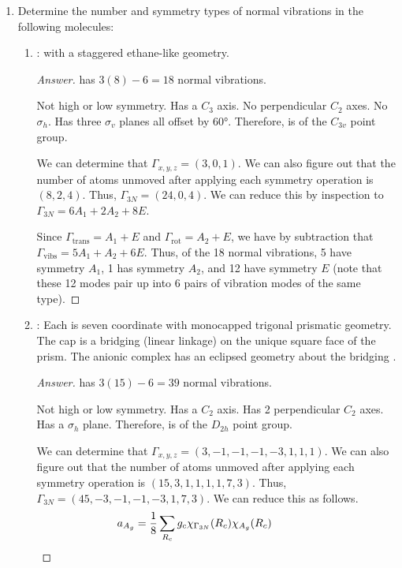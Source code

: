 \documentclass[../psets.tex]{subfiles}
\begin{document}
\begin{enumerate}[label={\Roman*)}]
\begin{proof}[Answer]
    \end{proof}
    \newpage
    \item Determine the number and symmetry types of normal vibrations in the following molecules:
    \begin{enumerate}[label={\alph*)}]
        \item {}: with a staggered ethane-like geometry.
        \begin{proof}[Answer]
             has $3(8)-6=18$ normal vibrations.\par
            Not high or low symmetry. Has a $C_3$ axis. No perpendicular $C_2$ axes. No $\sigma_h$. Has three $\sigma_v$ planes all offset by $\ang{60}$. Therefore,  is of the $C_{3v}$ point group.\par
            We can determine that $\Gamma_{x,y,z}=(3,0,1)$. We can also figure out that the number of atoms unmoved after applying each symmetry operation is $(8,2,4)$. Thus, $\Gamma_{3N}=(24,0,4)$. We can reduce this by inspection to $\Gamma_{3N}=6A_1+2A_2+8E$.\par
            Since $\Gamma_\text{trans}=A_1+E$ and $\Gamma_\text{rot}=A_2+E$, we have by subtraction that $\Gamma_\text{vibs}=5A_1+A_2+6E$. Thus, of the 18 normal vibrations, 5 have symmetry $A_1$, 1 has symmetry $A_2$, and 12 have symmetry $E$ (note that these 12 modes pair up into 6 pairs of vibration modes of the same type).
        \end{proof}
        \item {}: Each  is seven coordinate with monocapped trigonal prismatic geometry. The cap is a bridging  (linear  linkage) on the unique square face of the prism. The anionic complex has an eclipsed geometry about the bridging .
        \begin{proof}[Answer]
             has $3(15)-6=39$ normal vibrations.\par
            Not high or low symmetry. Has a $C_2$ axis. Has 2 perpendicular $C_2$ axes. Has a $\sigma_h$ plane. Therefore,  is of the $D_{2h}$ point group.\par
            We can determine that $\Gamma_{x,y,z}=(3,-1,-1,-1,-3,1,1,1)$. We can also figure out that the number of atoms unmoved after applying each symmetry operation is $(15,3,1,1,1,1,7,3)$. Thus, $\Gamma_{3N}=(45,-3,-1,-1,-3,1,7,3)$. We can reduce this as follows.
            \begin{align*}
                \hspace{-4em}a_{A_g}    &= \frac{1}{8}\sum_{R_c}g_c\chi_{\Gamma_{3N}}(R_c)\chi_{A_g}(R_c)\\

\end{align*}
\end{proof}
\end{enumerate}
\end{enumerate}
\end{document}

